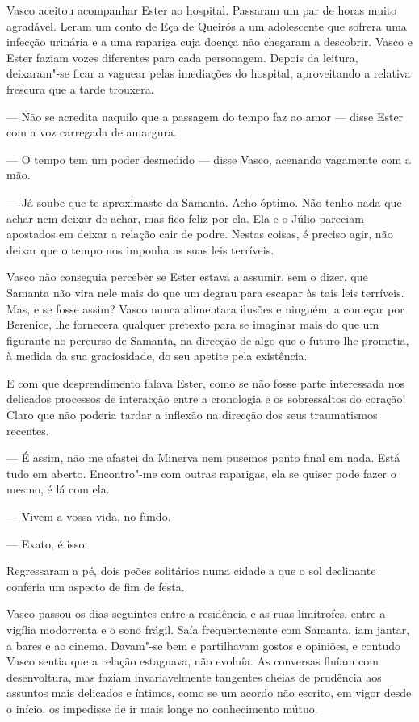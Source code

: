 Vasco aceitou acompanhar Ester ao hospital. Passaram um par de horas
muito agradável. Leram um conto de Eça de Queirós a um adolescente que
sofrera uma infecção urinária e a uma rapariga cuja doença não chegaram
a descobrir. Vasco e Ester faziam vozes diferentes para cada personagem.
Depois da leitura, deixaram"-se ficar a vaguear pelas imediações do
hospital, aproveitando a relativa frescura que a tarde trouxera.

--- Não se acredita naquilo que a passagem do tempo faz ao amor --- disse
  Ester com a voz carregada de amargura.

--- O tempo tem um poder desmedido --- disse Vasco, acenando vagamente com
  a mão.

--- Já soube que te aproximaste da Samanta. Acho óptimo. Não tenho nada
  que achar nem deixar de achar, mas fico feliz por ela. Ela e o Júlio
  pareciam apostados em deixar a relação cair de podre. Nestas coisas, é
  preciso agir, não deixar que o tempo nos imponha as suas leis
  terríveis.


Vasco não conseguia perceber se Ester estava a assumir, sem o dizer, que
Samanta não vira nele mais do que um degrau para escapar às tais leis
terríveis. Mas, e se fosse assim? Vasco nunca alimentara ilusões e
ninguém, a começar por Berenice, lhe fornecera qualquer pretexto para se
imaginar mais do que um figurante no percurso de Samanta, na direcção de
algo
que o futuro lhe prometia, à medida da sua graciosidade, do seu apetite
pela existência.

E com que desprendimento falava Ester, como se não fosse parte
interessada nos delicados processos de interacção entre a cronologia e
os sobressaltos do coração! Claro que não poderia tardar a inflexão na
direcção dos seus traumatismos recentes.

--- É assim, não me afastei da Minerva nem pusemos ponto final em nada.
  Está tudo em aberto. Encontro"-me com outras raparigas, ela se quiser
  pode fazer o mesmo, é lá com ela.

--- Vivem a vossa vida, no fundo.

--- Exato, é isso.


Regressaram a pé, dois peões solitários numa cidade a que o sol
declinante conferia um aspecto de fim de festa.

Vasco passou os dias seguintes entre a residência e as ruas limítrofes,
entre a vigília modorrenta e o sono frágil. Saía frequentemente com
Samanta, iam jantar, a bares e ao cinema. Davam"-se bem e partilhavam
gostos e opiniões, e contudo Vasco sentia que a relação estagnava, não
evoluía. As conversas fluíam com desenvoltura, mas faziam
invariavelmente tangentes cheias de prudência aos assuntos mais
delicados e íntimos, como se um acordo não escrito, em vigor desde o
início, os impedisse de ir mais longe no conhecimento mútuo.


